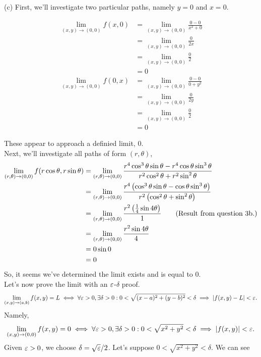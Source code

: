 \documentclass[a4paper, 11pt]{report}
\begin{document}
\sol (c) First, we'll investigate two particular paths, namely $y=0$ and $x=0$.
\begin{multicols}{2}\noindent\begin{align*}
	\lim_{(x,y)\to(0,0)}f(x,0) &= \lim_{(x,y)\to(0,0)}\frac{0-0}{x^2 + 0} \\
		&= \lim_{(x,y)\to(0,0)}\frac{0}{2x} \\
		&= \lim_{(x,y)\to(0,0)}\frac{0}{2} \\
		&= 0 \\
	\lim_{(x,y)\to(0,0)}f(0,x) &= \lim_{(x,y)\to(0,0)}\frac{0-0}{0 + y^2} \\
		&= \lim_{(x,y)\to(0,0)} \frac{0}{2y} \\
		&= \lim_{(x,y)\to(0,0)} \frac{0}{2} \\
		&= 0
\end{align*}\end{multicols}
\noindent These appear to approach a definied limit, 0. \\
\noindent Next, we'll investigate all paths of form $(r,\theta)$,
\begin{align*}
	\lim_{(r,\theta)\to(0,0)}f(r\cos\theta,r\sin\theta) &= \lim_{(r,\theta)\to(0,0)}\frac{r^4\cos^3\theta\sin\theta - r^4\cos\theta\sin^3\theta}{r^2\cos^2\theta + r^2\sin^2\theta} \\
		&= \lim_{(r,\theta)\to(0,0)}\frac{r^4\left( \cos^3\theta\sin\theta - \cos\theta\sin^3\theta \right)}{r^2\left( \cos^2\theta + \sin^2\theta \right)} \\
		&= \lim_{(r,\theta)\to(0,0)}\frac{r^2\left( \frac{1}{4}\sin4\theta \right)}{1} \tag*{(Result from question 3b.)} \\
		&= \lim_{(r,\theta)\to(0,0)}\frac{r^2\sin4\theta}{4} \\
		&= 0\sin0 \\
		&= 0
\end{align*}
So, it seems we've determined the limit exists and is equal to 0.\\
Let's now prove the limit with an $\varepsilon$-$\delta$ proof.
$$
	\lim_{(x,y)\to(a,b)} f(x,y) = L \iff \forall\varepsilon>0,\exists\delta>0: 0 < \sqrt{(x-a)^2+(y-b)^2} < \delta \implies \left| f(x,y) - L \right| < \varepsilon.
$$
Namely,
$$
	\lim_{(x,y)\to(0,0)} f(x,y) = 0 \iff \forall\varepsilon>0,\exists\delta>0: 0 < \sqrt{x^2+y^2} < \delta \implies \left| f(x,y) \right| < \varepsilon.
$$
Given $\varepsilon > 0$, we choose $\delta = \sqrt{\varepsilon}/2$. Let's suppose $0 < \sqrt{x^2 + y^2} < \delta$.
We can see
\end{document}
